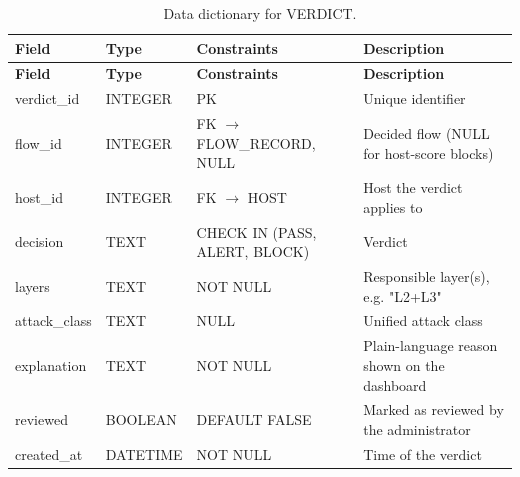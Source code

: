{\small
\begin{longtable}{|>{\raggedright\arraybackslash}p{}|>{\raggedright\arraybackslash}p{}|>{\raggedright\arraybackslash}p{}|>{\raggedright\arraybackslash}p{}|}
\caption{Data dictionary for VERDICT.}\label{tab:4.21}\\
\hline
\textbf{Field} & \textbf{Type} & \textbf{Constraints} & \textbf{Description} \\ \hline
\endfirsthead
\hline
\textbf{Field} & \textbf{Type} & \textbf{Constraints} & \textbf{Description} \\ \hline
\endhead
verdict\_id & INTEGER & PK & Unique identifier \\ \hline
flow\_id & INTEGER & FK $\rightarrow$ FLOW\_RECORD, NULL & Decided flow (NULL for host-score blocks) \\ \hline
host\_id & INTEGER & FK $\rightarrow$ HOST & Host the verdict applies to \\ \hline
decision & TEXT & CHECK IN (PASS, ALERT, BLOCK) & Verdict \\ \hline
layers & TEXT & NOT NULL & Responsible layer(s), e.g. "L2+L3" \\ \hline
attack\_class & TEXT & NULL & Unified attack class \\ \hline
explanation & TEXT & NOT NULL & Plain-language reason shown on the dashboard \\ \hline
reviewed & BOOLEAN & DEFAULT FALSE & Marked as reviewed by the administrator \\ \hline
created\_at & DATETIME & NOT NULL & Time of the verdict \\ \hline
\end{longtable}
}


